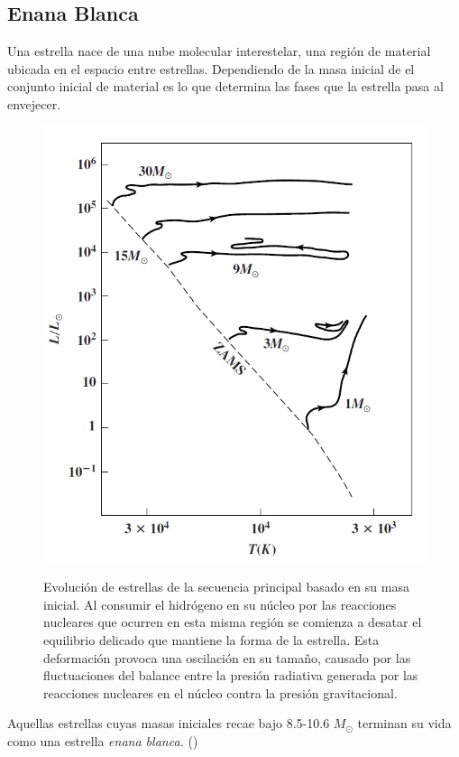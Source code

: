 \subsection*{Enana Blanca}

Una estrella nace de una nube molecular interestelar, una región de material ubicada en el espacio entre estrellas. Dependiendo de la masa inicial de el conjunto inicial de material es lo que determina las fases que la estrella pasa al envejecer. 

\begin{figure}
	\centering
	\includegraphics[scale=0.5]{Introduccion/Figures/Figura Evolucion_MS_Astronomy_Physical_Perspective.png}
	\caption{Evolución de estrellas de la secuencia principal basado en su masa inicial. Al consumir el hidrógeno en su núcleo por las reacciones nucleares que ocurren en esta misma región se comienza a desatar el equilibrio delicado que mantiene la forma de la estrella. Esta deformación provoca una oscilación en su tamaño, causado por las fluctuaciones del balance entre la presión radiativa generada por las reacciones nucleares en el núcleo contra la presión gravitacional.} \citet{astronomyPhysicalPerspective_stellarOldAgeChapter}
	\label{evolucionMSEstrella}
\end{figure}

Aquellas estrellas cuyas masas iniciales recae bajo 8.5-10.6 \(M_{\odot}\) terminan su vida como una estrella \textit{enana blanca.} (\citet*{whiteDwarfsReview}) 
